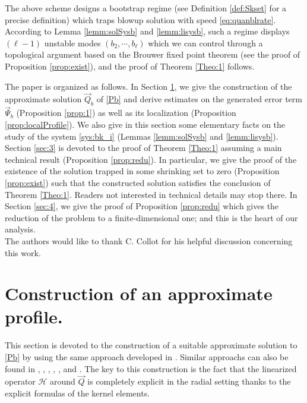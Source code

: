 \documentclass[11pt]{aims}
\theoremstyle{definition}
\numberwithin{equation}{section}
\begin{document}
The above scheme designs a bootstrap regime (see Definition \ref{def:Skset} for a precise definition) which traps blowup solution with speed \eqref{eq:quanblrate}. According to Lemma \ref{lemm:solSysb} and \ref{lemm:lisysb}, such a regime displays $(\ell - 1)$ unstable modes $(b_2, \cdots, b_\ell)$ which we can control through a topological argument based on the Brouwer fixed point theorem (see the proof of Proposition \ref{prop:exist}), and the proof of Theorem \ref{Theo:1} follows.\\

\bigskip 

The paper is organized as follows. In Section \ref{sec:2}, we give the construction of the approximate solution $\vec Q_b$ of \eqref{Pb} and derive estimates on the generated error term $\vec \Psi_b$ (Proposition \ref{prop:1}) as well as its localization (Proposition \ref{prop:localProfile}). We also give in this section some elementary facts on the study of the system \eqref{sys:bk_i} (Lemmas \ref{lemm:solSysb} and \ref{lemm:lisysb}). Section \ref{sec:3} is devoted to the proof of Theorem \ref{Theo:1} assuming a main technical result (Proposition \ref{prop:redu}). In particular, we give the proof of the existence of the solution trapped in some shrinking set to zero (Proposition \ref{prop:exist}) such that the constructed solution satisfies the conclusion of Theorem \ref{Theo:1}. Readers not interested in technical details may stop there. In Section \ref{sec:4}, we give the proof of Proposition \ref{prop:redu} which gives the reduction of the problem to a finite-dimensional one; and this is the heart of our analysis. \\

 The authors would like to thank C. Collot for his helpful discussion concerning this work.

\section{Construction of an approximate profile.}\label{sec:2}
This section is devoted to the construction of a suitable approximate solution to \eqref{Pb}  by using the same approach developed in \cite{MRRcjm15}. Similar approachs can also be found in \cite{RScpam13}, \cite{HRapde12}, \cite{RSma14}, \cite{Sjfa12}, \cite{Car16}, \cite{Car161} and \cite{IGN16}. The key to this construction is the fact that the linearized operator ${\mathscr{H}}$ around $\vec Q$ is completely explicit in the radial setting thanks to the explicit formulas of the kernel elements.
\end{document}
